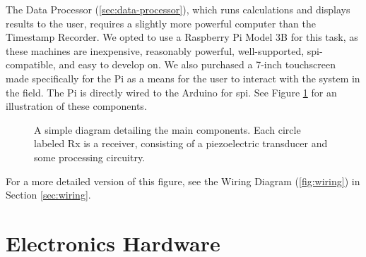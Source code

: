 \documentclass[12pt]{article}
\begin{document}
The Data Processor (\ref{sec:data-processor}),
which runs calculations and displays results to the user,
requires a slightly more powerful computer than the Timestamp Recorder.
We opted to use a Raspberry Pi Model 3B for this task, as these machines are
inexpensive, reasonably powerful, well-supported, \gls{spi}-compatible,
and easy to develop on.
We also purchased a 7-inch touchscreen made specifically for the Pi as a means
for the user to interact with the system in the field.
The Pi is directly wired to the Arduino for \gls{spi}.
See Figure \ref{fig:component-diagram} for an illustration of these components.

\begin{figure}[h]
\begin{center}
\end{center}
\caption{A simple diagram detailing the main components.
	Each circle labeled Rx is a receiver, consisting of a piezoelectric
	transducer and some processing circuitry.}
\label{fig:component-diagram}
\end{figure}

For a more detailed version of this figure, see the
Wiring Diagram (\ref{fig:wiring}) in Section \ref{sec:wiring}.

\section{Electronics Hardware}\label{sec:ee-hardware}
\end{document}
